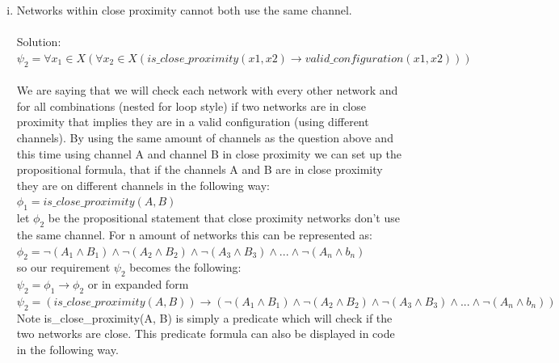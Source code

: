 \documentclass{article}
\newcommand*\moveToRight[1]{\hspace*{0em plus 1fill}\makebox{(#1)}}
\begin{document}
\begin{enumerate}[(a)]
\begin{enumerate}[(i)]
            \hspace*{5pt} $= \neg(A_1 \land A_2) \land \neg(A_1 \land A_3) \land \neg(A_2 \land A_3)$\\
            $\sigma$ says that we are connected to any network, so we must be connected to one network, for example if there were three channels we would say\\
            $\sigma = A_1 \lor A_2 \lor A_3$\\ Putting these together we have the predicate function for 3 channels (note this can be extended to any amount of channels\\ $is\_connected(network, channel) = (channel_1 \lor channel_2 \lor channel_3) \land \neg(channel_1 \land channel_2) \land \neg(channel_1 \land channel_3) \land \neg(channel_2 \land channel_3)$\\\\
            \item Networks within close proximity cannot both use the same channel. \moveToRight{2 marks}\\\\
            Solution: \\
            $\psi_2 = \forall x_1 \in X(\forall x_2 \in X(is\_close\_proximity(x1, x2) \to valid\_configuration(x1, x2)))$\\\\
            We are saying that we will check each network with every other network and for all combinations (nested for loop style) if two networks are in close proximity that implies they are in a valid configuration (using different channels). By using the same amount of channels as the question above and this time using channel A and channel B in close proximity we can set up the propositional formula, that if the channels A and B are in close proximity they are on different channels in the following way:\\
            $\phi_1 = is\_close\_proximity(A, B)$\\
            let $\phi_2$ be the propositional statement that close proximity networks don't use the same channel. For n amount of networks this can be represented as:\\
            $\phi_2 = \neg(A_1 \land B_1) \land \neg(A_2 \land B_2) \land \neg(A_3 \land B_3) \land ... \land \neg(A_n \land b_n)$\\
            so our requirement $\psi_2$ becomes the following:\\
            $\psi_2 = \phi_1 \to \phi_2$ or in expanded form\\
            $\psi_2 = (is\_close\_proximity(A,B)) \to (\neg(A_1 \land B_1) \land \neg(A_2 \land B_2) \land \neg(A_3 \land B_3) \land ... \land \neg(A_n \land b_n))$\\
            Note is\_close\_proximity(A, B) is simply a predicate which will check if the two networks are close. This predicate formula can also be displayed in code in the following way.\\
            

\end{enumerate}
\end{enumerate}
\end{document}
